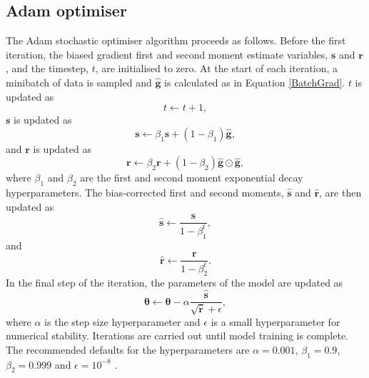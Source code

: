 \documentclass[12pt]{article}
\begin{document}
\subsection{Adam optimiser}
The Adam stochastic optimiser algorithm proceeds as follows. Before the first iteration, the biased gradient first and second moment estimate variables, $\bm{s}$ and $\bm{r}$, and the timestep, $t$, are initialised to zero. At the start of each iteration, a minibatch of data is sampled and $\hat{\bm{g}}$ is calculated as in Equation \ref{BatchGrad}. $t$ is updated as
\begin{equation}
t\leftarrow t+1,
\end{equation}
$\bm{s}$ is updated as
\begin{equation}
\bm{s}\leftarrow \beta_1\bm{s}+(1-\beta_1)\hat{\bm{g}},
\end{equation}
and $\bm{r}$ is updated as
\begin{equation}
\bm{r}\leftarrow \beta_2\bm{r}+(1-\beta_2)\hat{\bm{g}}\odot\hat{\bm{g}},
\end{equation}
where $\beta_1$ and $\beta_2$ are the first and second moment exponential decay hyperparameters. The bias-corrected first and second moments, $\hat{\bm{s}}$ and $\hat{\bm{r}}$, are then updated as
\begin{equation}
\hat{\bm{s}}\leftarrow \frac{\bm{s}}{1-\beta_1^t},
\end{equation}    
and
\begin{equation}
\hat{\bm{r}}\leftarrow \frac{\bm{r}}{1-\beta_2^t}.
\end{equation}
In the final step of the iteration, the parameters of the model are updated as
\begin{equation}
\bm{\theta}\leftarrow \bm{\theta}-\alpha\frac{\hat{\bm{s}}}{\sqrt{\hat{\bm{r}}}+\epsilon},
\end{equation}
where $\alpha$ is the step size hyperparameter and $\epsilon$ is a small hyperparameter for numerical stability. Iterations are carried out until model training is complete. The recommended defaults for the hyperparameters are $\alpha=0.001$, $\beta_1=0.9$, $\beta_2=0.999$ and $\epsilon=10^{-8}$ \cite{Kingma14}.     
\end{document}
